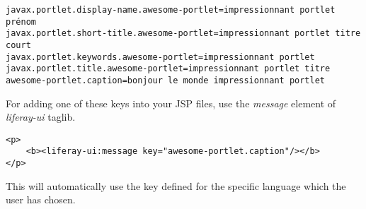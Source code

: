 \lstset{language=jsp}
\begin{lstlisting}[caption=Language\_fr.properties]
javax.portlet.display-name.awesome-portlet=impressionnant portlet prénom
javax.portlet.short-title.awesome-portlet=impressionnant portlet titre court
javax.portlet.keywords.awesome-portlet=impressionnant portlet
javax.portlet.title.awesome-portlet=impressionnant portlet titre
awesome-portlet.caption=bonjour le monde impressionnant portlet
\end{lstlisting}

For adding one of these keys into your JSP files, use the \textit{message} element of \textit{liferay-ui} taglib.

\lstset{language=jsp}
\begin{lstlisting}[caption=view.jsp]
<p>
	<b><liferay-ui:message key="awesome-portlet.caption"/></b>
</p>
\end{lstlisting}

This will automatically use the key defined for the specific language which the user has chosen.